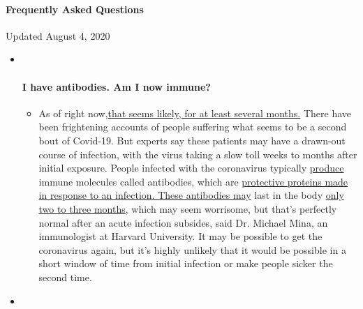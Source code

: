 \hypertarget{frequently-asked-questions}{%
\paragraph{Frequently Asked
Questions}\label{frequently-asked-questions}}

Updated August 4, 2020

\begin{itemize}
\item ~
  \hypertarget{i-have-antibodies-am-i-now-immune}{%
  \paragraph{I have antibodies. Am I now
  immune?}\label{i-have-antibodies-am-i-now-immune}}

  \begin{itemize}
  \tightlist
  \item
    As of right
    now,\href{https://www.nytimes.com/2020/07/22/health/covid-antibodies-herd-immunity.html?action=click\&pgtype=Article\&state=default\&region=MAIN_CONTENT_3\&context=storylines_faq}{that
    seems likely, for at least several months.} There have been
    frightening accounts of people suffering what seems to be a second
    bout of Covid-19. But experts say these patients may have a
    drawn-out course of infection, with the virus taking a slow toll
    weeks to months after initial exposure. People infected with the
    coronavirus typically
    \href{https://www.nature.com/articles/s41586-020-2456-9}{produce}
    immune molecules called antibodies, which are
    \href{https://www.nytimes.com/2020/05/07/health/coronavirus-antibody-prevalence.html?action=click\&pgtype=Article\&state=default\&region=MAIN_CONTENT_3\&context=storylines_faq}{protective
    proteins made in response to an
    infection}\href{https://www.nytimes.com/2020/05/07/health/coronavirus-antibody-prevalence.html?action=click\&pgtype=Article\&state=default\&region=MAIN_CONTENT_3\&context=storylines_faq}{.
    These antibodies may} last in the body
    \href{https://www.nature.com/articles/s41591-020-0965-6}{only two to
    three months}, which may seem worrisome, but that's perfectly normal
    after an acute infection subsides, said Dr. Michael Mina, an
    immunologist at Harvard University. It may be possible to get the
    coronavirus again, but it's highly unlikely that it would be
    possible in a short window of time from initial infection or make
    people sicker the second time.
  \end{itemize}
\item ~
  \hypertarget{im-a-small-business-owner-can-i-get-relief}{%
}
\end{itemize}
